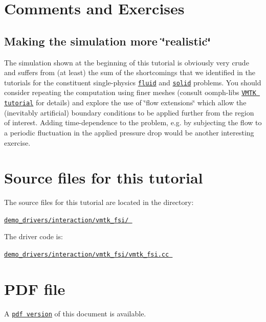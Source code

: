 \hypertarget{index_comm_ex}{}\section{Comments and Exercises}\label{index_comm_ex}
\hypertarget{index_realism}{}\subsection{Making the simulation more \char`\"{}realistic\char`\"{}}\label{index_realism}
The simulation shown at the beginning of this tutorial is obviously very crude and suffers from (at least) the sum of the shortcomings that we identified in the tutorials for the constituent single-\/physics \href{../../../navier_stokes/vmtk_fluid/html/index.html#realism}{\tt fluid} and \href{../../../solid/vmtk_solid/html/index.html#finer}{\tt solid} problems. You should consider repeating the computation using finer meshes (consult {\ttfamily oomph-\/lib\textquotesingle{}s} \href{../../../meshes/mesh_from_vmtk/html/index.html}{\tt V\+M\+TK tutorial} for details) and explore the use of \char`\"{}flow extensions\char`\"{} which allow the (inevitably artificial) boundary conditions to be applied further from the region of interest. Adding time-\/dependence to the problem, e.\+g. by subjecting the flow to a periodic fluctuation in the applied pressure drop would be another interesting exercise.



 

\hypertarget{index_sources}{}\section{Source files for this tutorial}\label{index_sources}

\begin{DoxyItemize}
\item The source files for this tutorial are located in the directory\+: \begin{center} \href{../../../../demo_drivers/interaction/vmtk_fsi/}{\tt demo\+\_\+drivers/interaction/vmtk\+\_\+fsi/ } \end{center} 
\item The driver code is\+: \begin{center} \href{../../../../demo_drivers/interaction/vmtk_fsi/vmtk_fsi.cc}{\tt demo\+\_\+drivers/interaction/vmtk\+\_\+fsi/vmtk\+\_\+fsi.\+cc } \end{center} 
\end{DoxyItemize}

 

 \hypertarget{index_pdf}{}\section{P\+D\+F file}\label{index_pdf}
A \href{../latex/refman.pdf}{\tt pdf version} of this document is available. 
